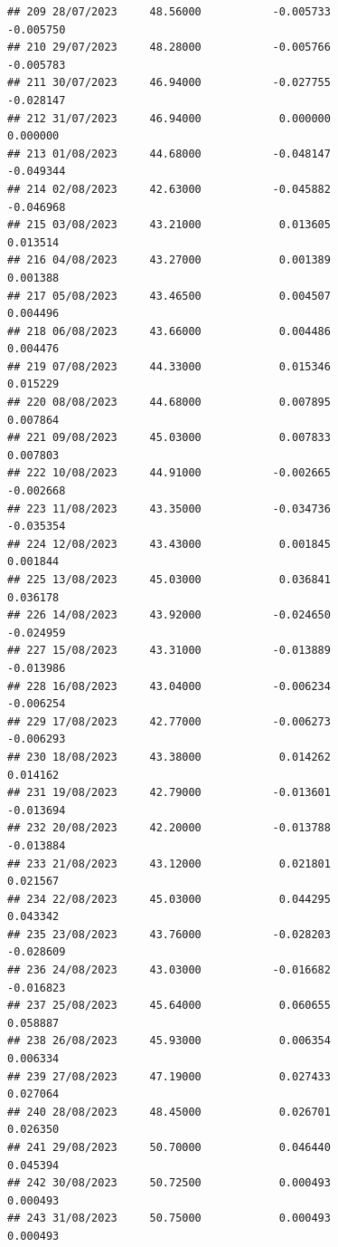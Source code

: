 \documentclass[
]{article}
\begin{document}
\begin{verbatim}
## 209 28/07/2023     48.56000           -0.005733               -0.005750
## 210 29/07/2023     48.28000           -0.005766               -0.005783
## 211 30/07/2023     46.94000           -0.027755               -0.028147
## 212 31/07/2023     46.94000            0.000000                0.000000
## 213 01/08/2023     44.68000           -0.048147               -0.049344
## 214 02/08/2023     42.63000           -0.045882               -0.046968
## 215 03/08/2023     43.21000            0.013605                0.013514
## 216 04/08/2023     43.27000            0.001389                0.001388
## 217 05/08/2023     43.46500            0.004507                0.004496
## 218 06/08/2023     43.66000            0.004486                0.004476
## 219 07/08/2023     44.33000            0.015346                0.015229
## 220 08/08/2023     44.68000            0.007895                0.007864
## 221 09/08/2023     45.03000            0.007833                0.007803
## 222 10/08/2023     44.91000           -0.002665               -0.002668
## 223 11/08/2023     43.35000           -0.034736               -0.035354
## 224 12/08/2023     43.43000            0.001845                0.001844
## 225 13/08/2023     45.03000            0.036841                0.036178
## 226 14/08/2023     43.92000           -0.024650               -0.024959
## 227 15/08/2023     43.31000           -0.013889               -0.013986
## 228 16/08/2023     43.04000           -0.006234               -0.006254
## 229 17/08/2023     42.77000           -0.006273               -0.006293
## 230 18/08/2023     43.38000            0.014262                0.014162
## 231 19/08/2023     42.79000           -0.013601               -0.013694
## 232 20/08/2023     42.20000           -0.013788               -0.013884
## 233 21/08/2023     43.12000            0.021801                0.021567
## 234 22/08/2023     45.03000            0.044295                0.043342
## 235 23/08/2023     43.76000           -0.028203               -0.028609
## 236 24/08/2023     43.03000           -0.016682               -0.016823
## 237 25/08/2023     45.64000            0.060655                0.058887
## 238 26/08/2023     45.93000            0.006354                0.006334
## 239 27/08/2023     47.19000            0.027433                0.027064
## 240 28/08/2023     48.45000            0.026701                0.026350
## 241 29/08/2023     50.70000            0.046440                0.045394
## 242 30/08/2023     50.72500            0.000493                0.000493
## 243 31/08/2023     50.75000            0.000493                0.000493

\end{verbatim}
\end{document}

